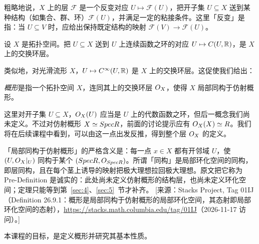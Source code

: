 粗略地说，$X$ 上的层 $\mathcal F$ 是一个反变对应 $U \mapsto \mathcal F(U)$，把开子集 $U \subseteq X$ 送到某种结构（如集合、群、环）$\mathcal F(U)$，并满足一定的粘接条件。这里「反变」是指：当 $U \subseteq V$ 时，应给出保持既定结构的映射 $\mathcal F(V) \to \mathcal F(U)$。

\begin{example}\label{ex:0.3.1}
设 $X$ 是拓扑空间。把 $U \subseteq X$ 送到 $U$ 上连续函数之环的对应 $U \mapsto C(U,\mathbb{R})$，是 $X$ 上的交换环层。
\end{example}

类似地，对光滑流形 $X$，$U \mapsto C^\infty(U,\mathbb{R})$ 是 $X$ 上的交换环层。这促使我们给出：

\begin{predefinition}\label{predef:0.3.2}
\emph{概形}是指一个拓扑空间 $X$，连同其上的交换环层 $O_X$，使得 $X$ 局部同构于仿射概形。
\end{predefinition}

这里对开子集 $U \subseteq X$，$O_X(U)$ 应当是 $U$ 上的代数函数之环，但后一概念我们尚未定义。不过对仿射概形 $X \simeq Spec R$，前面的讨论提示应有 $O_X(X) \simeq R$。我们将在后续课程中看到，可以由这一点出发反推，得到整个层 $O_X$ 的定义。

\begin{yizhu}
「局部同构于仿射概形」的严格含义是：每一点 $x \in X$ 都有开邻域 $U$，使 $(U, O_X|_U)$ 同构于某个 $(Spec R, O_{Spec R})$。所谓「同构」是局部环化空间的同构，即层同构，且在每个茎上诱导的映射把极大理想拉回极大理想。原文把它称为 Pre-Definition 是诚实的：此处尚未定义仿射概形的结构层，也尚未定义环化空间；定理只能等到第~\ref{sec:4}、\ref{sec:5}~节才补齐。
[来源：Stacks Project, Tag 01IJ（Definition 26.9.1：概形是局部同构于仿射概形的局部环化空间，其态射即局部环化空间的态射），\url{https://stacks.math.columbia.edu/tag/01IJ}（2026-11-17 访问）。]
\end{yizhu}

本课程的目标，是定义概形并研究其基本性质。
